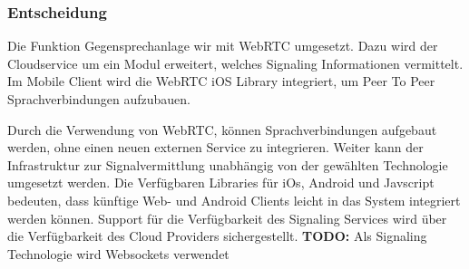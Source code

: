 \subsubsection{Entscheidung}

Die Funktion Gegensprechanlage wir mit WebRTC umgesetzt.
Dazu wird der Cloudservice um ein Modul erweitert, welches Signaling Informationen vermittelt.
Im Mobile Client wird die WebRTC iOS Library integriert, um Peer To Peer Sprachverbindungen aufzubauen.

Durch die Verwendung von WebRTC, können Sprachverbindungen aufgebaut werden, ohne einen neuen externen Service zu integrieren.
Weiter kann der Infrastruktur zur Signalvermittlung unabhängig von der gewählten Technologie umgesetzt werden.
Die Verfügbaren Libraries für iOs, Android und Javscript bedeuten, dass künftige Web- und Android Clients leicht in das System integriert werden können.
Support für die Verfügbarkeit des Signaling Services wird über die Verfügbarkeit des Cloud Providers sichergestellt.
\textbf{TODO:} Als Signaling Technologie wird Websockets verwendet

\clearpage
